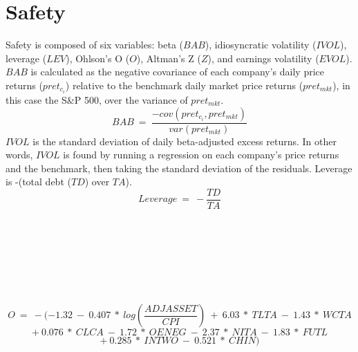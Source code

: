 \documentclass[12pt]{article}
\begin{document}
\section*{Safety}
Safety is composed of six variables: beta ($BAB$), idiosyncratic volatility ($IVOL$), leverage ($LEV$), Ohlson's O ($O$), Altman's Z ($Z$), and earnings volatility ($EVOL$). $BAB$ is calculated as the negative covariance of each company's daily price returns ($pret_{c_i}$) relative to the benchmark daily market price returns ($pret_{mkt}$), in this case the S\&P 500, over the variance of $pret_{mkt}$. $$BAB \ = \ \frac{-cov(pret_{c_i},pret_{mkt})}{var(pret_{mkt})}$$ $IVOL$ is the standard deviation of daily beta-adjusted excess returns. In other words, $IVOL$ is found by running a regression on each company's price returns and the benchmark, then taking the standard deviation of the residuals. Leverage is -(total debt ($TD$) over $TA$). $$Leverage \ = \ -\frac{TD}{TA}$$ 
\\
\\
\\
\\
\\
\\
\\
$$ O \ = \ -(-1.32 \ - \ 0.407 \ * \ log\left(\frac{ADJASSET}{CPI}\right) \ + \ 6.03 \ * \ TLTA \ - \ 1.43 \ * \ WCTA$$
$$ + \ 0.076 \ * \ CLCA \ - \ 1.72 \ * \ OENEG \ - \ 2.37 \ * \ NITA \ - \ 1.83 \ * \ FUTL$$
$$ + \ 0.285 \ * \ INTWO \ - \ 0.521 \ * \ CHIN)$$ 
\end{document}
